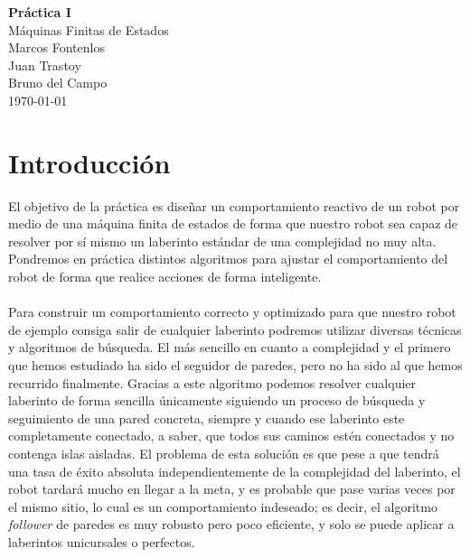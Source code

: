 \documentclass[a4paper,9pt]{article}
\begin{document}
\begin{titlepage}
    \centering
    \vspace*{5cm} %
    
    {\large\textbf{Práctica I}}\\[1.5cm] %
    {\Huge Máquinas Finitas de Estados}\\[1.5cm] %
    
    {\Large Marcos Fontenlos\\ %
    Juan Trastoy\\
    Bruno del Campo}\\[2cm] %
    
    {\large \today} %

    \vfill %

    
\end{titlepage}
\newpage
\tableofcontents
\newpage

\section{Introducción}
El objetivo de la práctica es diseñar un comportamiento reactivo de un robot por medio de una máquina finita de estados de forma que nuestro robot sea capaz de resolver por sí mismo un laberinto estándar de una complejidad no muy alta. Pondremos en práctica distintos algoritmos para ajustar el comportamiento del robot de forma que realice acciones de forma inteligente. 

\paragraph{}

Para construir un comportamiento correcto y optimizado para que nuestro robot de ejemplo consiga salir de cualquier laberinto podremos utilizar diversas técnicas y algoritmos de búsqueda. El más sencillo en cuanto a complejidad y el primero que hemos estudiado ha sido el seguidor de paredes, pero no ha sido al que hemos recurrido finalmente. Gracias a este algoritmo podemos resolver cualquier laberinto de forma sencilla únicamente siguiendo un proceso de búsqueda y seguimiento de una pared concreta, siempre y cuando ese laberinto este completamente conectado, a saber, que todos sus caminos estén conectados y no contenga islas aisladas. El problema de esta solución es que pese a que tendrá una tasa de éxito absoluta independientemente de la complejidad del laberinto, el robot tardará mucho en llegar a la meta, y es probable que pase varias veces por el mismo sitio, lo cual es un comportamiento indeseado; es decir, el algoritmo \textit{follower} de paredes es muy robusto pero poco eficiente, y solo se puede aplicar a laberintos unicursales o perfectos.
\end{document}
